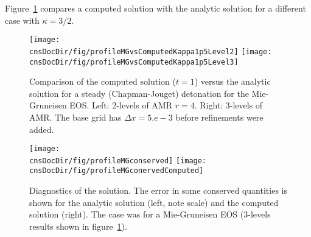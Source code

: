 \documentclass{article}
\newcommand{\obDir}{\homeHenshaw/res/OverBlown}
\newcommand{\cnsDocDir}{\homeHenshaw/cgDoc/cns}
\begin{document}
Figure~\ref{fig:detonationCJComparisonKappa1p5} compares a computed solution with the analytic solution for
a different case with $\kappa=3/2$.
\begin{figure}[hbt]
\begin{center}
  \texttt{[image: \\cnsDocDir/fig/profileMGvsComputedKappa1p5Level2]}
  \texttt{[image: \\cnsDocDir/fig/profileMGvsComputedKappa1p5Level3]}
 \end{center}
\caption{Comparison of the computed solution ($t=1$) versus the analytic solution for a steady (Chapman-Jouget) detonation for the Mie-Gruneisen EOS. Left: 2-levels of AMR $r=4$. Right: 3-levels of AMR. The
base grid has $\Delta x = 5.e-3$ before refinements were added.} \label{fig:detonationCJComparisonKappa1p5}
\end{figure}
% 



\begin{figure}[hbt]
\begin{center}
  \texttt{[image: \\cnsDocDir/fig/profileMGconserved]}
  \texttt{[image: \\cnsDocDir/fig/profileMGconervedComputed]}
 \end{center}
\caption{Diagnostics of the solution. The error in some conserved quantities is shown for
   the analytic solution (left, note scale) and the computed solution (right). The case was for a 
    Mie-Gruneisen EOS (3-levels results shown in figure~\ref{fig:detonationCJComparisonKappa1p5}). } 
   \label{fig:detonationConserved}
\end{figure}

% 
\end{document}
